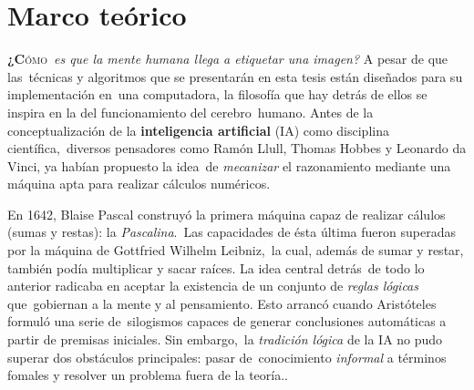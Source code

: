 \chapter{Marco teórico}

\noindent
\lettrine[lines=2, lhang=0.33, loversize=0.25]{\textbf{¿C}}{ómo}\
\emph{es que la mente humana llega a etiquetar una imagen?} A pesar de que las\
técnicas y algoritmos que se presentarán en esta tesis están diseñados para su implementación en\
una computadora, la filosofía que hay detrás de ellos se inspira en la del funcionamiento del cerebro\
humano. Antes de la conceptualización de la \textbf{inteligencia artificial} (IA) como disciplina científica,\
diversos pensadores como Ramón Llull, Thomas Hobbes y Leonardo da Vinci, ya habían propuesto la idea\
de \emph{mecanizar} el razonamiento mediante una máquina apta para realizar cálculos numéricos. \cite{russell2010}\par
En 1642, Blaise Pascal construyó la primera máquina capaz de realizar cálulos (sumas y restas): la \emph{Pascalina}.\
Las capacidades de ésta última fueron superadas por la máquina de Gottfried Wilhelm Leibniz,\
la cual, además de sumar y restar, también podía multiplicar y sacar raíces. La idea central detrás\
de todo lo anterior radicaba en aceptar la existencia de un conjunto de \emph{reglas lógicas} que\
gobiernan a la mente y al pensamiento. Esto arrancó cuando Aristóteles formuló una serie de\
silogismos capaces de generar conclusiones automáticas a partir de premisas iniciales. Sin embargo,\
la \emph{tradición lógica} de la IA no pudo superar dos obstáculos principales: pasar de\
conocimiento \emph{informal} a términos fomales y resolver un problema fuera de la teoría.\cite{russell2010}.\par




